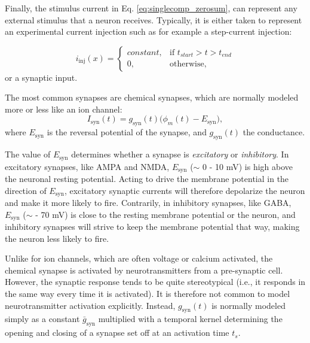 \subsubsection{}
Finally, the stimulus current in Eq. \ref{eq:singlecomp_zerosum}, can represent any external stimulus that a neuron receives. Typically, it is either taken to represent an experimental current injection such as for example a step-current injection:

\begin{equation}
i_\text{inj}(x)= 
\begin{cases}
    constant, & \text{if } t_{start} > t > t_{end} \\
    0,              & \text{otherwise},
\end{cases}
\label{eq:injected}
\end{equation}
or a synaptic input. 

The most common synapses are chemical synapses, which are normally modeled more or less like an ion channel:
\begin{equation}
I_\text{syn}(t) = g_\text{syn}(t) \big( \phi_m(t)-E_\text{syn} \big), 
\label{eq:chemicalsynapse}
\end{equation}
where $E_\text{syn}$ is the reversal potential of the synapse, and $g_\text{syn}(t)$ the conductance. 

The value of $E_\text{syn}$ determines whether a synapse is \textit{excitatory} or \textit{inhibitory}. In excitatory synapses, like 
AMPA and NMDA, $E_\text{syn}$ ($\sim$ 0 - 10 mV) is high above the neuronal resting potential. Acting to drive the membrane potential in the direction of $E_\text{syn}$, excitatory synaptic currents will therefore depolarize the neuron and make it more likely to fire. Contrarily, in inhibitory synapses, like GABA, $E_\text{syn}$ ($\sim$ - 70 mV) is close to the resting membrane potential or the neuron, and inhibitory synapses will strive to keep the membrane potential that way, making the neuron less likely to fire.

Unlike for ion channels, which are often voltage or calcium activated, the chemical synapse is activated by neurotransmitters from a pre-synaptic cell. However, the synaptic response tends to be quite stereotypical (i.e., it responds in the same way every time it is activated). It is therefore not common to model neurotransmitter activation explicitly. Instead, $g_\text{syn}(t)$ is normally modeled simply as a constant $\bar{g}_\text{syn}$ multiplied with a temporal kernel determining the opening and closing of a synapse set off at an activation time $t_s$. 

